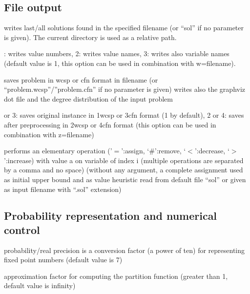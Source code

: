 \documentclass[letterpaper,10pt,openany,oneside,english]{sphinxmanual}
\begin{document}
\subsection{File output}
\label{\detokenize{userdoc:file-output}}\begin{description}
\sphinxAtStartPar
writes last/all solutions found in the specified
filename (or “sol” if no parameter is given). The current directory
is used as a relative path.

: writes value numbers, 2: writes value names, 3: writes also variable names (default value is 1, this option can be used in combination with \sphinxhyphen{}w=filename).

\sphinxAtStartPar
saves problem in wcsp or cfn format in filename (or
“problem.wcsp”/”problem.cfn” if no parameter is given) writes also
the graphviz dot file and the degree distribution of the input problem

 or 3: saves original instance in 1\sphinxhyphen{}wcsp or 3\sphinxhyphen{}cfn format
(1 by default), 2 or 4: saves
after preprocessing in 2\sphinxhyphen{}wcsp or 4\sphinxhyphen{}cfn format (this option can be
used in combination with \sphinxhyphen{}z=filename)

\sphinxAtStartPar
performs an elementary operation (’\(=\)’:assign, ‘\(\#\)’:remove, ‘\(<\)’:decrease, ‘\(>\)’:increase) with value a on variable of index i (multiple
operations are separated by a comma and no space) (without any
argument, a complete assignment \textendash{} used as initial upper bound and
as value heuristic \textendash{} read from default file “sol” or given as input
filename with “.sol” extension)

\end{description}


\subsection{Probability representation and numerical control}
\label{\detokenize{userdoc:probability-representation-and-numerical-control}}\begin{description}
\sphinxAtStartPar
probability/real precision is a conversion
factor (a power of ten) for representing fixed point numbers
(default value is 7)

\sphinxAtStartPar
approximation factor for computing the partition
function (greater than 1, default value is infinity)

\end{description}
\end{document}
